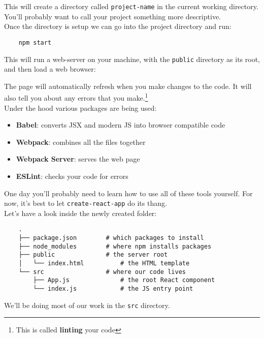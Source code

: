 This will create a directory called \texttt{project-name} in the current working directory. You'll probably want to call your project something more descriptive.
\\

Once the directory is setup we can go into the project directory and run:

\begin{verbatim}
    npm start
\end{verbatim}

This will run a web-server on your machine, with the \texttt{public} directory as its root, and then load a web browser:


The page will automatically refresh when you make changes to the code. It will also tell you about any errors that you make.\footnote{This is called \textbf{linting} your code}
\\

Under the hood various packages are being used:

\begin{itemize}
    \item \textbf{Babel}: converts JSX and modern JS into browser compatible code
    \item \textbf{Webpack}: combines all the files together
    \item \textbf{Webpack Server}: serves the web page
    \item \textbf{ESLint}: checks your code for errors
\end{itemize}

One day you'll probably need to learn how to use all of these tools yourself. For now, it's best to let \texttt{create-react-app} do its thang.
\\

Let's have a look inside the newly created folder:

\begin{verbatim}
    .
    ├── package.json        # which packages to install
    ├── node_modules        # where npm installs packages
    ├── public              # the server root
    │   └── index.html          # the HTML template
    └── src                 # where our code lives
        ├── App.js              # the root React component
        └── index.js            # the JS entry point
\end{verbatim}

We'll be doing most of our work in the \texttt{src} directory.


